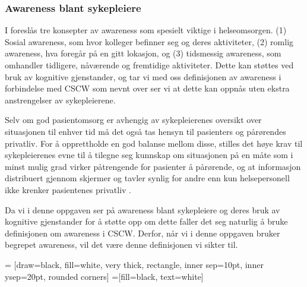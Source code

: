\subsubsection{Awareness blant sykepleiere}
I \cite{Randell} foreslås tre konsepter av awareness som spesielt viktige i helseomsorgen. (1) Sosial awareness, som hvor kolleger befinner seg og deres aktiviteter, (2) romlig awareness, hva foregår på en gitt lokasjon, og (3) tidsmessig awareness, som omhandler tidligere, nåværende og fremtidige aktiviteter. 
Dette kan støttes ved bruk av kognitive gjenstander, og tar vi med oss definisjonen av awareness i forbindelse med CSCW som nevnt over ser vi at dette kan oppnås uten ekstra anstrengelser av sykepleierene.

\noindent
Selv om god pasientomsorg er avhengig av sykepleierenes oversikt over situasjonen til enhver tid må det også tas hensyn til pasienters og pårørendes privatliv. For å opprettholde en god balanse mellom disse, stilles det høye krav til sykepleierenes evne til å tilegne seg kunnskap om situasjonen på en måte som i minst mulig grad virker påtrengende for pasienter å pårørende, og at informasjon distribuert gjennom skjermer og tavler synlig for andre enn kun helsepersonell ikke krenker pasientenes privatliv \cite{Ebright10}.

\noindent
Da vi i denne oppgaven ser på awareness blant sykepleiere og deres bruk av kognitive gjenstander for å støtte opp om dette faller det seg naturlig å bruke definisjonen om awareness i CSCW. Derfor, når vi i denne oppgaven bruker begrepet awareness, vil det være denne definisjonen vi sikter til.

 = [draw=black, fill=white, very thick,
    rectangle, inner sep=10pt, inner ysep=20pt, rounded corners]
 =[fill=black, text=white]
%
